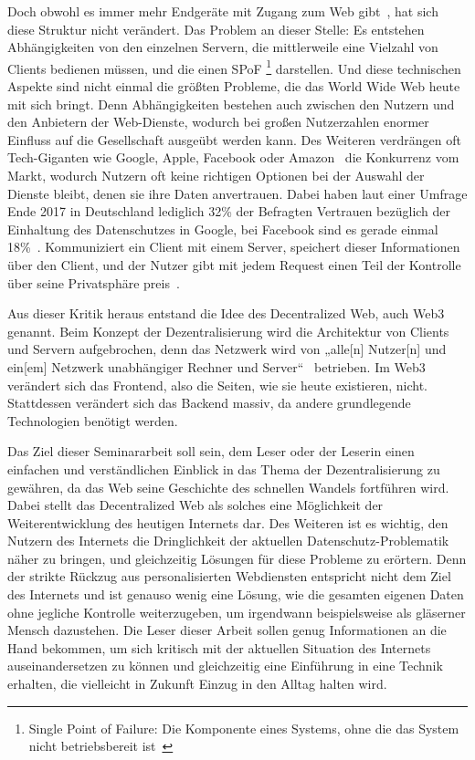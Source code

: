 Doch obwohl es immer mehr Endgeräte mit Zugang zum Web gibt~\cite{CiscoSystems.2011}, hat sich diese Struktur nicht verändert. Das Problem an dieser Stelle: Es entstehen Abhängigkeiten von den einzelnen Servern, die mitt\-ler\-wei\-le eine Vielzahl von Clients bedienen müssen, und die einen SPoF
\footnote{
	Single Point of Failure: Die Komponente eines Systems, ohne die das System nicht betriebsbereit ist~\cite{ITWissen.info.2017}
}
darstellen. 
Und diese technischen Aspekte sind nicht einmal die größten Probleme, die das World Wide Web heute mit sich bringt. 
Denn Abhängigkeiten bestehen auch zwischen den Nutzern und den Anbietern der Web-Dienste, wodurch bei großen Nutzerzahlen enormer Einfluss auf die Gesellschaft ausgeübt werden kann. 
Des Weiteren verdrängen oft Tech-Giganten wie Google, Apple, Facebook oder Amazon~\cite{Beutelsbacher.2016} die Konkurrenz vom Markt, wodurch Nutz\-ern oft keine richtigen Optionen bei der Auswahl der Dienste bleibt, denen sie ihre Daten anvertrauen. 
Dabei haben laut einer Umfrage Ende 2017 in
Deutschland lediglich 32\% der Befragten Vertrauen bezüglich der Einhaltung des
Datenschutzes in Google, bei Facebook sind es gerade einmal 18\%~\cite{Horizont.2017}.
Kommuniziert ein Client mit einem Server, speichert dieser Informationen über den Client,
und der Nutzer gibt mit jedem Request einen Teil der Kontrolle über seine Privatsphäre preis~\cite[S. 21]{Voshmgir.2019}.

Aus dieser Kritik heraus entstand die Idee des Decentralized Web, auch Web3 genannt. Beim
Konzept der Dezentralisierung wird die Architektur von Clients und Servern aufgebrochen,
denn das Netzwerk wird von „alle[n] Nutzer[n] und ein[em] Netzwerk unabhängiger Rechner
und Server“~\cite{Bonset.2019} betrieben. Im Web3 verändert sich das Frontend, also die Seiten, wie sie heute existieren, nicht. Stattdessen verändert sich das Backend massiv, da andere grundlegende Technologien benötigt werden.

\smallskip

Das Ziel dieser Seminararbeit soll sein, dem Leser oder der Leserin einen einfachen und
verständlichen Einblick in das Thema der Dezentralisierung zu gewähren, da das Web seine
Geschichte des schnellen Wandels fortführen wird. Dabei stellt das Decentralized Web als
solches eine Möglichkeit der Weiterentwicklung des heutigen Internets dar. Des Weiteren ist
es wichtig, den Nutzern des Internets die Dringlichkeit der aktuellen Datenschutz-Problematik
näher zu bringen, und gleichzeitig Lösungen für diese Probleme zu erörtern. Denn der strikte
Rückzug aus personalisierten Webdiensten entspricht nicht dem Ziel des Internets und ist
genauso wenig eine Lösung, wie die gesamten eigenen Daten ohne jegliche Kontrolle
weiterzugeben, um irgendwann beispielsweise als gläserner Mensch dazustehen. Die Leser
dieser Arbeit sollen genug Informationen an die Hand bekommen, um sich kritisch mit der
aktuellen Situation des Internets auseinandersetzen zu können und gleichzeitig eine Einführung in eine Technik erhalten, die vielleicht in Zukunft Einzug in den Alltag halten wird.


